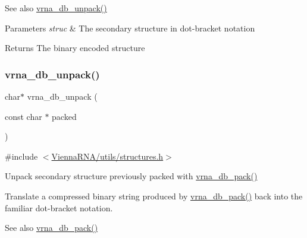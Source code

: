 \begin{DoxySeeAlso}{See also}
\mbox{\hyperlink{group__struct__utils__dot__bracket_ga6490adff857d84ce06e6f379ae3a4512}{vrna\+\_\+db\+\_\+unpack()}} 
\end{DoxySeeAlso}

\begin{DoxyParams}{Parameters}
{\em struc} & The secondary structure in dot-\/bracket notation \\
\hline
\end{DoxyParams}
\begin{DoxyReturn}{Returns}
The binary encoded structure 
\end{DoxyReturn}
\mbox{\label{group__struct__utils__dot__bracket_ga6490adff857d84ce06e6f379ae3a4512}} 
\subsubsection{\texorpdfstring{vrna\_db\_unpack()}{vrna\_db\_unpack()}}
{\footnotesize\ttfamily char$\ast$ vrna\+\_\+db\+\_\+unpack (\begin{DoxyParamCaption}\item[{const char $\ast$}]{packed }\end{DoxyParamCaption})}



{\ttfamily \#include $<$\mbox{\hyperlink{utils_2structures_8h}{Vienna\+R\+N\+A/utils/structures.\+h}}$>$}



Unpack secondary structure previously packed with \mbox{\hyperlink{group__struct__utils__dot__bracket_ga55c4783060a1464f862f858d5599c9e1}{vrna\+\_\+db\+\_\+pack()}} 

Translate a compressed binary string produced by \mbox{\hyperlink{group__struct__utils__dot__bracket_ga55c4783060a1464f862f858d5599c9e1}{vrna\+\_\+db\+\_\+pack()}} back into the familiar dot-\/bracket notation.

\begin{DoxySeeAlso}{See also}
\mbox{\hyperlink{group__struct__utils__dot__bracket_ga55c4783060a1464f862f858d5599c9e1}{vrna\+\_\+db\+\_\+pack()}} 
\end{DoxySeeAlso}

